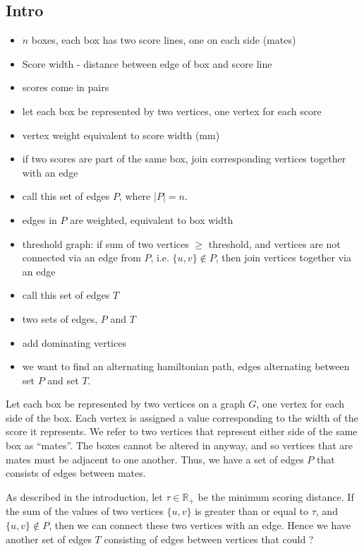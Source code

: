 \documentclass{llncs}
\begin{document}
\subsection{Intro}
\begin{itemize}
	\item $n$ boxes, each box has two score lines, one on each side (mates)
	\item Score width - distance between edge of box and score line
	\item scores come in pairs
	\item let each box be represented by two vertices, one vertex for each score
	\item vertex weight equivalent to score width (mm)
	\item if two scores are part of the same box, join corresponding vertices together with an edge
	\item call this set of edges $P$, where $|P| = n$.
	\item edges in $P$ are weighted, equivalent to box width
	\item threshold graph: if sum of two vertices $\geq$ threshold, and vertices are not connected via an edge from $P$, i.e. $\{u, v\} \notin P$, then join vertices together via an edge
	\item call this set of edges $T$
	\item two sets of edges, $P$ and $T$
	\item add dominating vertices
	\item we want to find an alternating hamiltonian path, edges alternating between set $P$ and set $T$.
\end{itemize}

Let each box be represented by two vertices on a graph $G$, one vertex for each side of the box. Each vertex is assigned a value corresponding to the width of the score it represents. We refer to two vertices that represent either side of the same box as ``mates''. The boxes cannot be altered in anyway, and so vertices that are mates must be adjacent to one another. Thus, we have a set of edges $P$ that consists of edges between mates.

As described in the introduction, let $\tau \in \mathbb{R}_{+}$ be the minimum scoring distance. If the sum of the values of two vertices $\{u, v\}$ is greater than or equal to $\tau$, and $\{u,v\} \notin P$, then we can connect these two vertices with an edge. Hence we have another set of edges $T$ consisting of edges between vertices that could ?  
\end{document}
